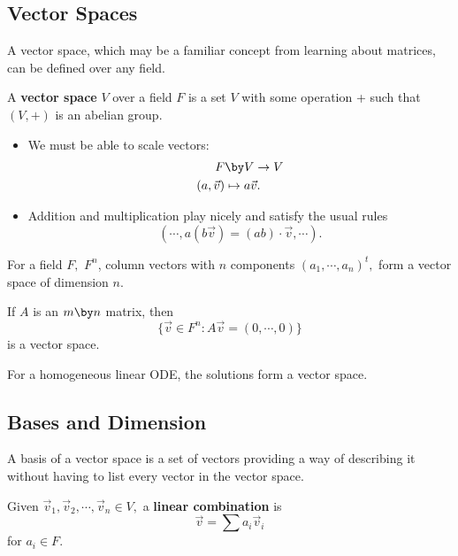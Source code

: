 \subsection{Vector Spaces}

A vector space, which may be a familiar concept from learning about matrices, can be defined over any field. 
\begin{definition}
A \textbf{vector space} $V$ over a field $F$ is a set $V$ with some operation + such that $(V, +)$ is an abelian group. 
\begin{itemize}
    \item We must be able to scale vectors:
    \begin{align*}
    F &\by V \rightarrow V \\
    (a, \vec{v}) &\mapsto a\vec{v}.
    \end{align*}
    \item Addition and multiplication play nicely and satisfy the usual rules 
    \[
    (\cdots, a(b\vec{v}) = (ab) \cdot \vec{v}, \cdots ).
    \]
    
\end{itemize}
\end{definition}

\begin{example}
For a field $F,$ $F^n$, column vectors with $n$ components $(a_1, \cdots, a_n)^t,$ form a vector space of dimension $n.$
\end{example}

\begin{example}
If $A$ is an $m \by n$ matrix, then 
\[
\{\vec{v} \in F^n : A\vec{v} = (0, \cdots, 0)\}
\]
is a vector space.
\end{example}

\begin{example}
For a homogeneous linear ODE, the solutions form a vector space.
\end{example}

\subsection{Bases and Dimension}

A basis of a vector space is a set of vectors providing a way of describing it without having to list every vector in the vector space.
\begin{definition}
Given $\vec{v}_1, \vec{v}_2, \cdots, \vec{v}_n \in V,$ a \textbf{linear combination} is 
\[
\vec{v} = \sum a_i\vec{v}_i
\]
for $a_i \in F.$
\end{definition}

